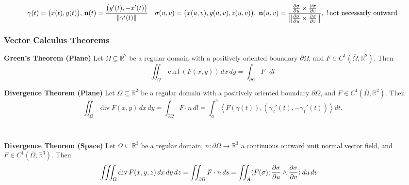 \documentclass[8pt]{article}
\begin{document}
$$\gamma(t) = \big(x(t), y(t)\big), \, \mathbf{n}(t) = \frac{\big(y'(t), -x'(t)\big)}{\left\|\gamma'(t)\right\|} \vspace{-20px}
	\quad \sigma(u, v) = \big(x(u, v), y(u, v), z(u, v)\big), \;
	\mathbf{n}(u, v) = \frac{\frac{\partial \sigma}{\partial u} \times \frac{\partial \sigma}{\partial v}}
	{\left\|\frac{\partial \sigma}{\partial u} \times \frac{\partial \sigma}{\partial v}\right\|}, \; \text{!\,not necessarly outward}
$$
\vspace{-10px}
\subsubsection*{Vector Calculus Theorems}
\vspace{-10px}
\begin{minipage}[htp]{0.49\textwidth}
	\noindent\textbf{Green's Theorem (Plane)}
	Let \( \Omega \subseteq \mathbb{R}^2 \) be a regular domain with a positively oriented boundary \( \partial \Omega \), and \( F \in C^1(\overline{\Omega}, \mathbb{R}^2) \). Then
	\vspace{-10px}\[
		\iint_{\Omega} \operatorname{curl}(F(x, y)) \, dx \, dy = \int_{\partial \Omega} F \cdot dl
	\]
\end{minipage}
\hfill
\begin{minipage}[htp]{0.49\textwidth}
	\noindent\textbf{Divergence Theorem (Plane)}
	Let \( \Omega \subseteq \mathbb{R}^2 \) be a regular domain with a positively oriented boundary \( \partial \Omega \), and \( F \in C^1(\overline{\Omega}, \mathbb{R}^2) \). Then
	\vspace{-10px}\[
		\iint_{\Omega} \operatorname{div} F(x, y) \, dx \, dy = \int_{\partial \Omega} F \cdot n \, dl = \int_a^b \left\langle F(\gamma(t)), (\gamma_2'(t), -\gamma_1'(t)) \right\rangle dt.
	\]
\end{minipage}
\\
\begin{minipage}[htp]{0.49\textwidth}
	\noindent\textbf{Divergence Theorem (Space)}
	Let \( \Omega \subseteq \mathbb{R}^3 \) be a regular domain, \( n : \partial \Omega \to \mathbb{R}^3 \) a continuous outward unit normal vector field, and \( F \in C^1(\overline{\Omega}, \mathbb{R}^3) \). Then
	\[\hspace{-10px}
		\iiint_{\Omega} \operatorname{div} F(x,y,z) \, dx \, dy \, dz = \iint_{\partial \Omega} F \cdot n \, ds = \iint_{A} \langle F(\sigma); \frac{\partial \sigma}{\partial u} \wedge \frac{\partial \sigma}{\partial v} \rangle \, du \, dv
	\]

\end{minipage}
\end{document}
